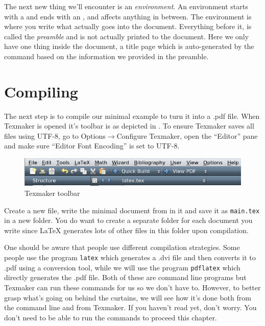 The next new thing we'll encounter is an \emph{environment}. An environment starts with a \latexin{\begin} and ends with an \latexin{\end}, and affects anything in between. The  environment is where you write what actually goes into the document. Everything before it, is called the \emph{preamble} and is not actually printed to the document. Here we only have one thing inside the document, a title page which is auto-generated by the \latexin{\maketitle} command based on the information we provided in the preamble.

\section{Compiling}
The next step is to compile our minimal example to turn it into a .pdf file. When Texmaker is opened it's toolbar is as depicted in . To ensure Texmaker saves all files using UTF-8, go to Options$\rightarrow$Configure Texmaker, open the ``Editor'' pane and make sure ``Editor Font Encoding'' is set to UTF-8.
\begin{figure}
	\centering
	\includegraphics[width=\textwidth]{graphics/texmaker.png}
	\caption{Texmaker toolbar}
	\label{fig:latex:texmaker}
\end{figure}

Create a new file, write the minimal document from  in it and save it as \texttt{main.tex} in a new folder. You do want to create a separate folder for each document you write since \LaTeX{} generates lots of other files in this folder upon compilation.

One should be aware that people use different compilation strategies. Some people use the program \texttt{latex} which generates a .dvi file and then converts it to .pdf using a conversion tool, while we will use the program \texttt{pdflatex} which directly generates the .pdf file. Both of these are command line programs but Texmaker can run these commands for us so we don't have to. However, to better grasp what's going on behind the curtains, we will see how it's done both from the command line and from Texmaker. If you haven't read  yet, don't worry. You don't need to be able to run the commands to proceed this chapter.

